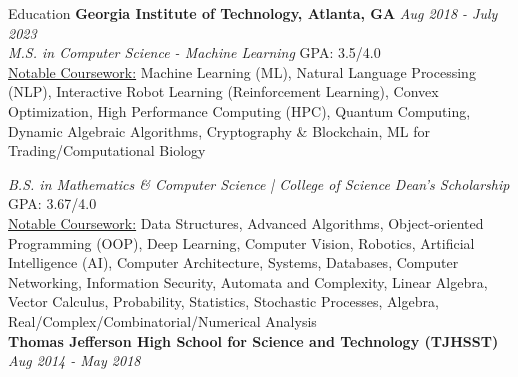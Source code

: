 \documentclass{template} %
\begin{document}

\begin{rSection}{Education}
{\bf Georgia Institute of Technology, Atlanta, GA} \hfill {\em Aug 2018 - July 2023}
\\ {\em M.S. in Computer Science - Machine Learning} \hfill  GPA: 3.5/4.0
\vspace{0.1cm}
\\ \underline{Notable Coursework:} Machine Learning (ML), Natural Language Processing (NLP), Interactive Robot Learning (Reinforcement Learning), Convex Optimization, High Performance Computing (HPC), Quantum Computing, Dynamic Algebraic Algorithms, Cryptography \& Blockchain, ML for Trading/Computational Biology 

{\em B.S. in Mathematics \& Computer Science | College of Science Dean's Scholarship} \hfill  GPA: 3.67/4.0
\vspace{0.1cm}
\\ \underline{Notable Coursework:} Data Structures, Advanced Algorithms, Object-oriented Programming (OOP), Deep Learning, Computer Vision, Robotics, Artificial Intelligence (AI), Computer Architecture, Systems, Databases, Computer Networking, Information Security, Automata and Complexity, Linear Algebra, Vector Calculus, Probability, Statistics, Stochastic Processes, Algebra, Real/Complex/Combinatorial/Numerical Analysis
\vspace{0.20cm}
\\ {\bf Thomas Jefferson High School for Science and Technology (TJHSST)} \hfill {\em Aug 2014 - May 2018}
\end{rSection}

\end{document}
